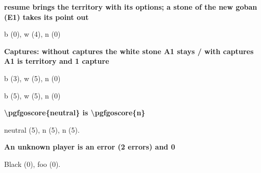 \documentclass{article}
\newcommand\case[1]{\par\medskip\noindent\textbf{#1}\par\nopagebreak}
\newcommand\score[3]{\quad b \pgfgoscore{b} (#1), w \pgfgoscore{w} (#2), n \pgfgoscore{n} (#3)}
\begin{document}
\case{resume brings the territory with its options; a stone of the new goban (E1) takes its point out}
\begin{goban}[5, name = auto-resume]\end{goban}
\begin{goban}[5, resume = {auto-resume, territory}]\end{goban}\score{0}{4}{0}

\case{Captures: without captures the white stone A1 stays / with captures A1 is territory and 1 capture}
\begin{goban}[5]\end{goban}\score{3}{5}{0}
\begin{goban}[5, captures]\end{goban}\score{5}{5}{0}

\case{\textbackslash pgfgoscore\{neutral\} is \textbackslash pgfgoscore\{n\}}
\begin{goban}[5]\end{goban}
neutral  (5), n  (5), { n }  (5).

\case{An unknown player is an error (2 errors) and 0}
Black  (0), foo  (0).
\end{document}
